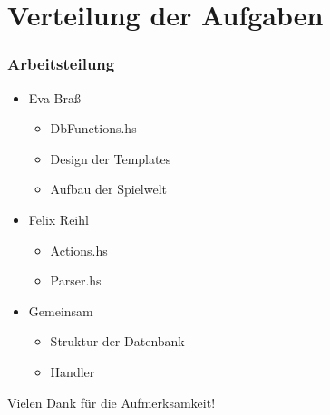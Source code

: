 \documentclass[hyperref={pdfpagelabels=false}]{beamer}
\begin{document}
\section{Verteilung der Aufgaben}
\begin{frame}
  \frametitle{Arbeitsteilung}
  \begin{itemize}
    \item Eva Braß
      \begin{itemize}
        \item DbFunctions.hs
        \item Design der Templates
        \item Aufbau der Spielwelt
      \end{itemize}
    \item Felix Reihl
      \begin{itemize}
        \item Actions.hs
        \item Parser.hs
      \end{itemize}
    \item Gemeinsam
      \begin{itemize}
        \item Struktur der Datenbank
        \item Handler
      \end{itemize}
  \end{itemize}
\end{frame}
\begin{frame}
  \centering Vielen Dank für die Aufmerksamkeit!
\end{frame}
\end{document}
